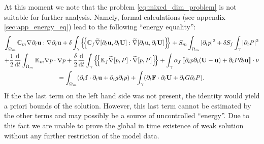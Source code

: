 \documentclass[a4paper]{m2an}
\numberwithin{equation}{section}
\def\agrad{\widetilde\nabla}
\def\avg#1{\left\{\mskip-5mu\left\{#1\right\}\mskip-5mu\right\}}
\def\CC{\tn C}
\def\ddt#1{\xdrv{#1}{t}}
\def\dt{\prtl_t}
\def\FF{\vc F}
\def\ff{\vc f}
\def\jmp#1{\left\llbracket #1 \right\rrbracket}
\def\nnu{\vc\nu}
\def\prtl{\partial}
\def\tn#1{{\mathbb{#1}}}    %
\def\U{\vc U}
\def\uu{\vc u}
\def\vc#1{\mathbf{#1}}     %
\newcommand{\ml}[1]{\begin{multline}#1\end{multline}}
\begin{document}
At this moment we note that the problem \eqref{eq:mixed_dim_problem} is not suitable for further analysis.
Namely, formal calculations (see appendix \ref{sec:app_energy_eq}) lead to the following ``energy equality'':
\ml{ \label{eq:apriori_biot} \int_{\Omega_m}\CC_m\nabla\dt\uu:\nabla\dt\uu + \delta\int_\gamma\avg{\CC_f\agrad[\dt\uu,\dt\U]:\agrad[\dt\uu,\dt\U]}
+ S_m\int_{\Omega_m}|\dt p|^2 + \delta S_f\int_\gamma|\dt P|^2\\
+ \frac12\ddt{}\int_{\Omega_m}\tn K_m\nabla p\cdot\nabla p
+ \frac\delta2\ddt{}\int_\gamma\avg{\tn K_f\agrad[p,P]\cdot\agrad[p,P]}
+ \int_\gamma\alpha_f\jmp{\dt p\dt(\U-\uu) + \dt P\dt\uu}\cdot\nnu\\
= \int_{\Omega_m}(\dt\ff\cdot\dt\uu + \dt g \dt p) + \int_\gamma(\dt\FF\cdot\dt\U + \dt G \dt P). }
If the the last term on the left hand side was not present, the identity would yield a priori bounds of the solution.
However, this last term cannot be estimated by the other terms and may possibly be a source of uncontrolled ``energy''.
Due to this fact we are unable to prove the global in time existence of weak solution without any further restriction of the model data.
\end{document}
